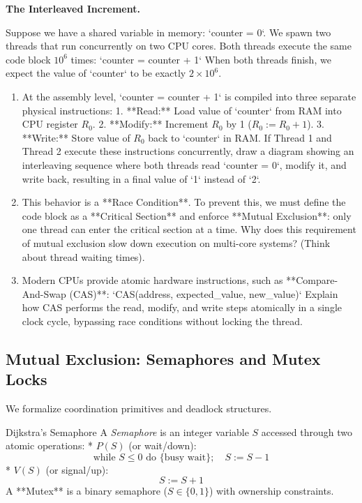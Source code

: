 \documentclass[12pt, a4paper]{book}
\newcommand{\newterm}[1]{\textit{\textcolor{DiscoveryColor}{#1}}}
\begin{document}
\begin{puzzlebox}
\textbf{The Interleaved Increment.}

Suppose we have a shared variable in memory: `counter = 0`.
We spawn two threads that run concurrently on two CPU cores. Both threads execute the same code block $10^6$ times:
`counter = counter + 1`
When both threads finish, we expect the value of `counter` to be exactly $2 \times 10^6$.
\begin{enumerate}[label=(\alph*), leftmargin=*]
  \item At the assembly level, `counter = counter + 1` is compiled into three separate physical instructions:
        1. **Read:** Load value of `counter` from RAM into CPU register $R_0$.
        2. **Modify:** Increment $R_0$ by 1 ($R_0 := R_0 + 1$).
        3. **Write:** Store value of $R_0$ back to `counter` in RAM.
        If Thread 1 and Thread 2 execute these instructions concurrently, draw a diagram showing an interleaving sequence where both threads read `counter = 0`, modify it, and write back, resulting in a final value of `1` instead of `2`.
  \item This behavior is a **Race Condition**.
        To prevent this, we must define the code block as a **Critical Section** and enforce **Mutual Exclusion**: only one thread can enter the critical section at a time.
        Why does this requirement of mutual exclusion slow down execution on multi-core systems? (Think about thread waiting times).
  \item Modern CPUs provide atomic hardware instructions, such as **Compare-And-Swap (CAS)**:
        `CAS(address, expected_value, new_value)`
        Explain how CAS performs the read, modify, and write steps atomically in a single clock cycle, bypassing race conditions without locking the thread.
\end{enumerate}
\end{puzzlebox}

\subsection{Mutual Exclusion: Semaphores and Mutex Locks}

We formalize coordination primitives and deadlock structures.

\begin{namedconcept}{Dijkstra's Semaphore}
A \newterm{Semaphore} is an integer variable $S$ accessed through two atomic operations:
* $P(S)$ (or wait/down):
  \[
    \text{while } S \le 0 \text{ do } \{ \text{busy wait} \}; \quad S := S - 1
  \]
* $V(S)$ (or signal/up):
  \[
    S := S + 1
  \]
A **Mutex** is a binary semaphore ($S \in \{0, 1\}$) with ownership constraints.
\end{namedconcept}
\end{document}
